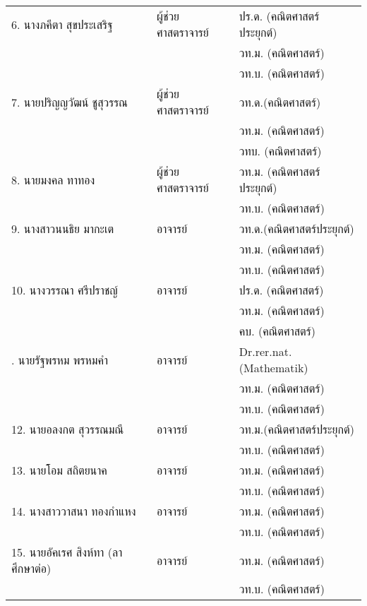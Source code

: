 {\begin{center}
{\begin{longtable}{|p{}|p{}|p{}|}
			6. นางภคีตา สุขประเสริฐ
			&	ผู้ช่วยศาสตราจารย์ 
			& ปร.ด. (คณิตศาสตร์ประยุกต์)\\
			&& วท.ม. (คณิตศาสตร์)\\
			&& วท.บ. (คณิตศาสตร์) 	\\	\hline
			
			
			7. นายปริญญวัฒน์ ชูสุวรรณ
			&ผู้ช่วยศาสตราจารย์
			&วท.ด.(คณิตศาสตร์)\\
			&&วท.ม. (คณิตศาสตร์)\\
			&&วทบ. (คณิตศาสตร์)\\\hline
			
			
			8. นายมงคล ทาทอง
			&	ผู้ช่วยศาสตราจารย์
			&วท.ม. (คณิตศาสตร์ประยุกต์)\\
			&&วท.บ. (คณิตศาสตร์)\\ \hline
			
			
			9. นางสาวนนธิย มากะเต
			&อาจารย์
			&วท.ด.(คณิตศาสตร์ประยุกต์)\\
			&&วท.ม. (คณิตศาสตร์)\\
			&&วท.บ. (คณิตศาสตร์)\\\hline
			
			
			10.  นางวรรณา ศรีปราชญ์
			& อาจารย์
			& ปร.ด. (คณิตศาสตร์)\\
			&& วท.ม. (คณิตศาสตร์)\\
			&& คบ. (คณิตศาสตร์)\\\hline
			
		\newpage%
			11. นายรัฐพรหม พรหมคำ
			&	อาจารย์
			&Dr.rer.nat. (Mathematik)\\
			&&วท.ม. (คณิตศาสตร์)\\
			&&วท.บ. (คณิตศาสตร์)\\\hline
			
			
			12. นายอลงกต สุวรรณมณี
			&อาจารย์
			&วท.ม.(คณิตศาสตร์ประยุกต์)\\
			&&วท.บ. (คณิตศาสตร์)\\\hline
			
			
			13. นายโอม สถิตยนาค
			&อาจารย์	
			& วท.ม.  (คณิตศาสตร์) \\
			&&วท.บ. (คณิตศาสตร์)\\\hline
			
			14. นางสาววาสนา ทองกำแหง
			&อาจารย์
			&วท.ม. (คณิตศาสตร์)\\
			&&วท.บ. (คณิตศาสตร์)\\\hline
			
		
			15. นายอัคเรศ สิงห์ทา (ลาศึกษาต่อ)
			&อาจารย์
			&วท.ม. (คณิตศาสตร์)\\
			&& วท.บ. (คณิตศาสตร์)\\\hline
			

\end{longtable}}
\end{center}}

